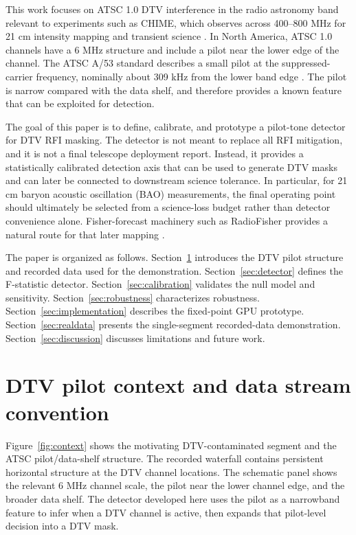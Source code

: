 \documentclass[10pt,letterpaper]{article}
\begin{document}
This work focuses on ATSC 1.0 DTV interference in the radio astronomy band relevant to experiments such as CHIME, which observes across 400--800 MHz for 21 cm intensity mapping and transient science \cite{CHIMEOverview2022}. In North America, ATSC 1.0 channels have a 6 MHz structure and include a pilot near the lower edge of the channel. The ATSC A/53 standard describes a small pilot at the suppressed-carrier frequency, nominally about 309 kHz from the lower band edge \cite{ATSC_A53_Part2_2011}. The pilot is narrow compared with the data shelf, and therefore provides a known feature that can be exploited for detection.

The goal of this paper is to define, calibrate, and prototype a pilot-tone detector for DTV RFI masking. The detector is not meant to replace all RFI mitigation, and it is not a final telescope deployment report. Instead, it provides a statistically calibrated detection axis that can be used to generate DTV masks and can later be connected to downstream science tolerance. In particular, for 21 cm baryon acoustic oscillation (BAO) measurements, the final operating point should ultimately be selected from a science-loss budget rather than detector convenience alone. Fisher-forecast machinery such as RadioFisher provides a natural route for that later mapping \cite{Bull2015,RadioFisher2021}.

The paper is organized as follows. Section~\ref{sec:dtv_context} introduces the DTV pilot structure and recorded data used for the demonstration. Section~\ref{sec:detector} defines the F-statistic detector. Section~\ref{sec:calibration} validates the null model and sensitivity. Section~\ref{sec:robustness} characterizes robustness. Section~\ref{sec:implementation} describes the fixed-point GPU prototype. Section~\ref{sec:realdata} presents the single-segment recorded-data demonstration. Section~\ref{sec:discussion} discusses limitations and future work.

\section{DTV pilot context and data stream convention}
\label{sec:dtv_context}

Figure~\ref{fig:context} shows the motivating DTV-contaminated segment and the ATSC pilot/data-shelf structure. The recorded waterfall contains persistent horizontal structure at the DTV channel locations. The schematic panel shows the relevant 6 MHz channel scale, the pilot near the lower channel edge, and the broader data shelf. The detector developed here uses the pilot as a narrowband feature to infer when a DTV channel is active, then expands that pilot-level decision into a DTV mask.
\end{document}
